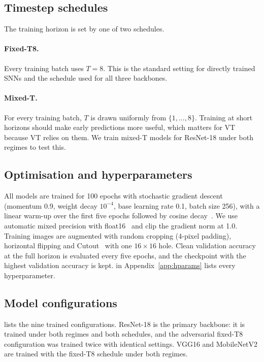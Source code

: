 \subsection{Timestep schedules}

The training horizon is set by one of two schedules.

\paragraph{Fixed-T8.} Every training batch uses $T = 8$. This is the standard setting for directly trained SNNs and the schedule used for all three backbones.

\paragraph{Mixed-T.} For every training batch, $T$ is drawn uniformly from $\{1, \dots, 8\}$. Training at short horizons should make early predictions more useful, which matters for VT because VT relies on them. We train mixed-T models for ResNet-18 under both regimes to test this.

\subsection{Optimisation and hyperparameters}

All models are trained for 100 epochs with stochastic gradient descent (momentum 0.9, weight decay $10^{-4}$, base learning rate 0.1, batch size 256), with a linear warm-up over the first five epochs followed by cosine decay~\cite{loshchilov2017sgdr}. We use automatic mixed precision with float16~\cite{micikevicius2018mixed} and clip the gradient norm at 1.0. Training images are augmented with random cropping (4-pixel padding), horizontal flipping and Cutout~\cite{devries2017improved} with one $16\times16$ hole. Clean validation accuracy at the full horizon is evaluated every five epochs, and the checkpoint with the highest validation accuracy is kept.  in Appendix~\ref{app:hparams} lists every hyperparameter.

\subsection{Model configurations}

 lists the nine trained configurations. ResNet-18 is the primary backbone: it is trained under both regimes and both schedules, and the adversarial fixed-T8 configuration was trained twice with identical settings. VGG16 and MobileNetV2 are trained with the fixed-T8 schedule under both regimes.


